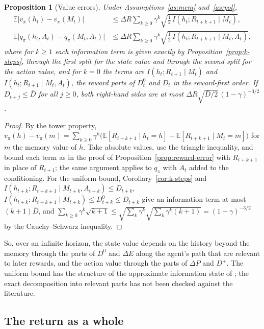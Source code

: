 \documentclass{article}
\newtheorem{proposition}{Proposition}
\theoremstyle{definition}
\theoremstyle{remark}
\newcommand{\E}{\mathbb{E}}
\newcommand{\dE}{\Delta E}
\newcommand{\dP}{\Delta P}
\begin{document}
\begin{proposition}[Value errors]\label{prop:value}
Under Assumptions~\ref{as:mem} and~\ref{as:pol},
\begin{align*}
\E\big|v_\pi(h_t)-v_\pi(M_t)\big|&\le\Delta R\sum_{k\ge0}\gamma^k\sqrt{\tfrac12\,I(h_t;R_{t+k+1}\mid M_t)},\\
\E\big|q_\pi(h_t,A_t)-q_\pi(M_t,A_t)\big|&\le\Delta R\sum_{k\ge0}\gamma^k\sqrt{\tfrac12\,I(h_t;R_{t+k+1}\mid M_t,A_t)},
\end{align*}
where for $k\ge1$ each information term is given exactly by Proposition~\ref{prop:k-steps}, through the first split for the state value and through the second split for the action value, and for $k=0$ the terms are $I(h_t;R_{t+1}\mid M_t)$ and $I(h_t;R_{t+1}\mid M_t,A_t)$, the reward parts of $D^0_t$ and $D_t$ in the reward-first order. If $D_{t+j}\le\bar D$ for all $j\ge0$, both right-hand sides are at most $\Delta R\sqrt{\bar D/2}\,(1-\gamma)^{-3/2}$.
\end{proposition}

\begin{proof}
By the tower property, $v_\pi(h)-v_\pi(m)=\sum_{k\ge0}\gamma^k\big(\E[R_{t+k+1}\mid h_t=h]-\E[R_{t+k+1}\mid M_t=m]\big)$ for $m$ the memory value of $h$. Take absolute values, use the triangle inequality, and bound each term as in the proof of Proposition~\ref{prop:reward-error} with $R_{t+k+1}$ in place of $R_{t+1}$; the same argument applies to $q_\pi$ with $A_t$ added to the conditioning. For the uniform bound, Corollary~\ref{cor:k-steps} and $I(h_{t+k};R_{t+k+1}\mid M_{t+k},A_{t+k})\le D_{t+k}$, $I(h_{t+k};R_{t+k+1}\mid M_{t+k})\le D^0_{t+k}\le D_{t+k}$ give an information term at most $(k+1)\bar D$, and $\sum_{k\ge0}\gamma^k\sqrt{k+1}\le\sqrt{\sum_k\gamma^k}\sqrt{\sum_k\gamma^k(k+1)}=(1-\gamma)^{-3/2}$ by the Cauchy--Schwarz inequality.
\end{proof}

So, over an infinite horizon, the state value depends on the history beyond the memory through the parts of $D^0$ and $\dE$ along the agent's path that are relevant to later rewards, and the action value through the parts of $\dP$ and $D^+$. The uniform bound has the structure of the approximate information state of \citet{subramanian2022approximate}; the exact decomposition into relevant parts has not been checked against the literature.

\subsection{The return as a whole}
\end{document}

